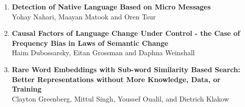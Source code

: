 \documentclass[a0,portrait]{a0poster}
\begin{document}
{\begin{enumerate}
        \textbf{Semantically Motivated Hebrew Verb-Noun Multi-Word Expressions
        Identification}\\
        Chaya Liebeskind and Yaakov Hacohen-Kerner
        \item
        \textbf{Detection of Native Language Based on Micro Messages}\\
        Yohay Nahari, Maayan Matook and Oren Tsur
        \item
        \textbf{Causal Factors of Language Change Under Control - the Case of Frequency Bias in Laws of Semantic
        Change}\\
        Haim Dubossarsky, Eitan Grossman and Daphna Weinshall
        \item
        \textbf{Rare Word Embeddings with Sub-word Similarity Based Search: Better Representations without More
        Knowledge, Data, or Training}\\
        Clayton Greenberg, Mittul Singh, Youssef Oualil, and Dietrich Klakow
    \end{enumerate}
    }
\end{document}
